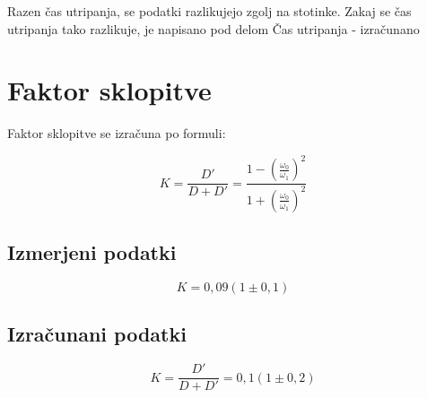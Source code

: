 \documentclass[a4paper]{report}
\begin{document}
Razen čas utripanja, se podatki razlikujejo zgolj na stotinke. Zakaj se čas utripanja tako razlikuje, je napisano pod delom Čas utripanja - izračunano

\section*{Faktor sklopitve}

Faktor sklopitve se izračuna po formuli:

\[ 
  K = \frac{D'}{D+D'} = \frac{1-(\frac{\omega_0}{\omega_1})^2}{1 + (\frac{\omega_0}{\omega_1})^2}
\]

\subsection*{Izmerjeni podatki}

\[
  K =  0,09 (1 \pm 0,1)
\]

\subsection*{Izračunani podatki}

\[
  K = \frac{D'}{D+D'} = 0,1(1 \pm 0,2)
\]


                                                                                                                                                                         
\end{document}
